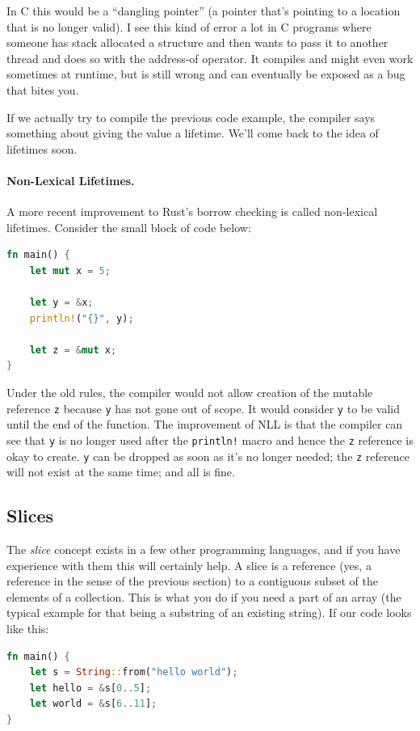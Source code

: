 \documentclass[a4paper]{report}
\begin{document}
In C this would be a ``dangling pointer'' (a pointer that's pointing to a location that is no longer valid). I see this kind of error a lot in C programs where someone has stack allocated a structure and then wants to pass it to another thread and does so with the address-of operator. It compiles and might even work sometimes at runtime, but is still wrong and can eventually be exposed as a bug that bites you.

If we actually try to compile the previous code example, the compiler says something about giving the value a lifetime. We'll come back to the idea of lifetimes soon.

\paragraph{Non-Lexical Lifetimes.} A more recent improvement to Rust's borrow checking is called non-lexical lifetimes. Consider the small block of code below:
\begin{lstlisting}[language=Rust]
fn main() {
    let mut x = 5;

    let y = &x;
    println!("{}", y);

    let z = &mut x;
}
\end{lstlisting}

Under the old rules, the compiler would not allow creation of the mutable reference \texttt{z} because \texttt{y} has not gone out of scope. It would consider \texttt{y} to be valid until the end of the function. The improvement of NLL is that the compiler can see that \texttt{y} is no longer used after the \texttt{println!} macro and hence the \texttt{z} reference is okay to create. \texttt{y} can be dropped as soon as it's no longer needed; the \texttt{z} reference will not exist at the same time; and all is fine.

\subsection*{Slices}
The \textit{slice} concept exists in a few other programming languages, and if you have experience with them this will certainly help. A slice is a reference (yes, a reference in the sense of the previous section) to a contiguous subset of the elements of a collection. This is what you do if you need a part of an array (the typical example for that being a substring of an existing string). If our code looks like this:

\begin{lstlisting}[language=Rust]
fn main() {
    let s = String::from("hello world");
    let hello = &s[0..5];
    let world = &s[6..11];
}
\end{lstlisting}
\end{document}
